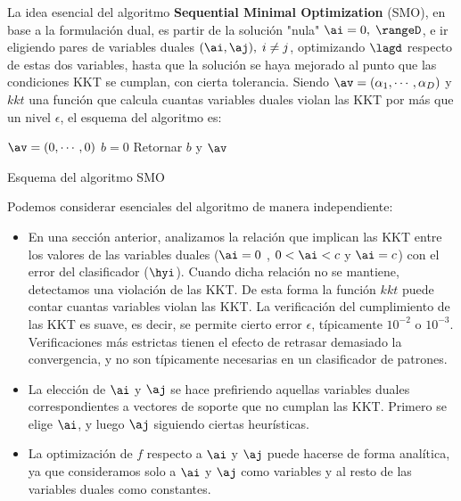 La idea esencial del algoritmo \textbf{Sequential Minimal Optimization} (SMO), en base a la formulación dual, es partir de la solución "nula" $\ai = 0, \; \rangeD$, e ir eligiendo pares de variables duales $(\ai,\aj), \; i \neq j $, optimizando $\lagd$ respecto de estas dos variables, hasta que la solución se haya mejorado al punto que las condiciones KKT se cumplan, con cierta tolerancia. Siendo $\av = (\alpha_1,\cdots,\alpha_D)$ y $kkt$ una función que calcula cuantas variables duales violan las KKT por más que un nivel $\epsilon$, el esquema del algoritmo es:


\begin{algorithm}[H]
$\av=(0,\cdots,0)$\;
$b=0$\;
Retornar  $b$ y $\av$
\caption{Esquema del algoritmo SMO} 
\end{algorithm}

Podemos considerar  esenciales del algoritmo de manera independiente:

\begin{itemize}
\item En una sección anterior, analizamos la relación que implican las KKT entre los valores de las variables duales ($\ai =0$ , $0 <\ai < c$ y $\ai = c$) con el error del clasificador ($\hyi$). Cuando dicha relación no se mantiene, detectamos una violación de las KKT. De esta forma la función $kkt$ puede contar cuantas variables violan las KKT. La verificación del cumplimiento de las KKT es suave, es decir, se permite cierto error $\epsilon$, típicamente $10^{-2}$ o $10^{-3}$. Verificaciones más estrictas tienen el efecto de retrasar demasiado la convergencia, y no son típicamente necesarias en un clasificador de patrones. 

\item La elección de $\ai$ y $\aj$ se hace prefiriendo aquellas variables duales correspondientes a vectores de soporte que no cumplan las KKT. Primero se elige $\ai$, y luego $\aj$ siguiendo ciertas heurísticas.

\item La optimización de $f$ respecto a $\ai$ y $\aj$ puede hacerse de forma analítica, ya que consideramos solo a $\ai$ y $\aj$ como variables y al resto de las variables duales como constantes.
\end{itemize}

